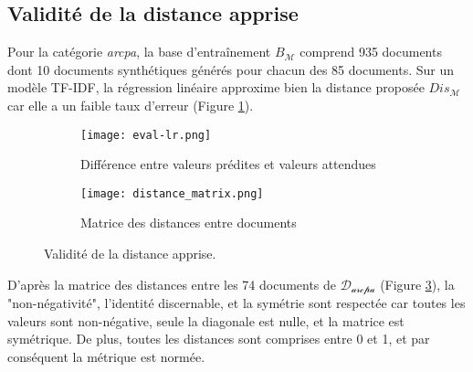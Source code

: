 \subsection{Validité de la distance apprise}
Pour la catégorie \textit{arcpa}, la base d'entraînement $B_\mathcal{M}$ comprend 935 documents dont 10 documents synthétiques générés pour chacun des 85 documents. Sur un modèle TF-IDF, la régression linéaire approxime bien la distance proposée $Dis_\mathcal{M}$ car elle a un faible taux d'erreur (Figure \ref{fig:similarite:eval-regression}).

%	
%
\begin{figure}[!htb]
\begin{subfigure}[ht]{0.49\textwidth}
	\centering \texttt{[image: eval-lr.png]} \hfil
	
	\caption{Différence entre valeurs prédites et valeurs attendues}\label{fig:similarite:eval-regression}
\end{subfigure}
\begin{subfigure}[ht]{0.49\textwidth}
	\centering \texttt{[image: distance\_matrix.png]}
	\caption{Matrice des distances entre documents}\label{fig:similarite:distance_matrix}
\end{subfigure}
\caption{Validité de la distance apprise.}
\end{figure}

D'après la matrice des distances entre les 74 documents de $\mathcal{D_{\text{arcpa}}}$ (Figure \ref{fig:similarite:distance_matrix}),  la "non-négativité", l'identité discernable, et la symétrie sont respectée car toutes les valeurs sont non-négative, seule la diagonale est nulle, et la matrice est symétrique. De plus, toutes les distances sont comprises entre 0 et 1, et par conséquent la métrique est normée.



